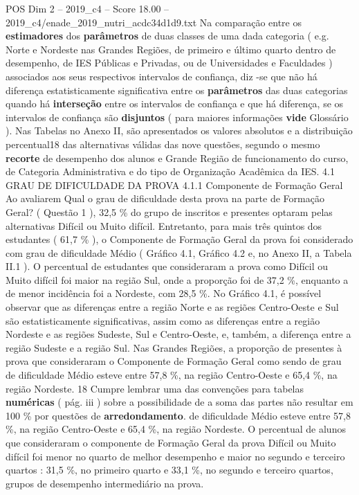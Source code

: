 \begin{textsample}{POS Dim 2 – 2019\_c4 – Score 18.00 – 2019\_c4/enade\_2019\_nutri\_acdc34d1d9.txt}
Na comparação entre os \textbf{estimadores} dos \textbf{parâmetros} de duas classes de uma dada categoria ( e.g.
Norte e Nordeste nas Grandes Regiões, de primeiro e último quarto dentro de desempenho, de IES Públicas e Privadas, ou de Universidades e Faculdades ) associados aos seus respectivos intervalos de confiança, diz -se que não há diferença estatisticamente significativa entre os \textbf{parâmetros} das duas categorias quando há \textbf{interseção} entre os intervalos de confiança e que há diferença, se os intervalos de confiança são \textbf{disjuntos} ( para maiores informações \textbf{vide} Glossário ).
Nas Tabelas no Anexo II, são apresentados os valores absolutos e a distribuição percentual18 das alternativas válidas das nove questões, segundo o mesmo \textbf{recorte} de desempenho dos alunos e Grande Região de funcionamento do curso, de Categoria Administrativa e do tipo de Organização Acadêmica da IES. 4.1 GRAU DE DIFICULDADE DA PROVA 4.1.1 Componente de Formação Geral Ao avaliarem Qual o grau de dificuldade desta prova na parte de Formação Geral? ( Questão 1 ), 32,5 \% do grupo de inscritos e presentes optaram pelas alternativas Difícil ou Muito difícil.
Entretanto, para mais três quintos dos estudantes ( 61,7 \% ), o Componente de Formação Geral da prova foi considerado com grau de dificuldade Médio ( Gráfico 4.1, Gráfico 4.2 e, no Anexo II, a Tabela II.1 ).
O percentual de estudantes que consideraram a prova como Difícil ou Muito difícil foi maior na região Sul, onde a proporção foi de 37,2 \%, enquanto a de menor incidência foi a Nordeste, com 28,5 \%.
No Gráfico 4.1, é possível observar que as diferenças entre a região Norte e as regiões Centro-Oeste e Sul são estatisticamente significativas, assim como as diferenças entre a região Nordeste e as regiões Sudeste, Sul e Centro-Oeste, e, também, a diferença entre a região Sudeste e a região Sul.
Nas Grandes Regiões, a proporção de presentes à prova que consideraram o Componente de Formação Geral como sendo de grau de dificuldade Médio esteve entre 57,8 \%, na região Centro-Oeste e 65,4 \%, na região Nordeste. 18 Cumpre lembrar uma das convenções para tabelas \textbf{numéricas} ( pág. iii ) sobre a possibilidade de a soma das partes não resultar em 100 \% por questões de \textbf{arredondamento}. de dificuldade Médio esteve entre 57,8 \%, na região Centro-Oeste e 65,4 \%, na região Nordeste.
O percentual de alunos que consideraram o componente de Formação Geral da prova Difícil ou Muito difícil foi menor no quarto de melhor desempenho e maior no segundo e terceiro quartos : 31,5 \%, no primeiro quarto e 33,1 \%, no segundo e terceiro quartos, grupos de desempenho intermediário na prova.

\end{textsample}

